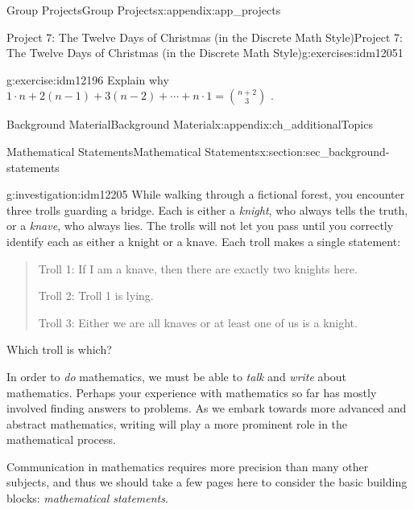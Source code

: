 \documentclass[oneside,10pt,]{book}
\numberwithin{equation}{chapter}
\begin{document}
\begin{appendixptx}{Group Projects}{}{Group Projects}{}{}{x:appendix:app_projects}
\begin{exercises-section-numberless}{Project 7: The Twelve Days of Christmas (in the Discrete Math Style)}{}{Project 7: The Twelve Days of Christmas (in the Discrete Math Style)}{}{}{g:exercises:idm12051}
\begin{divisionexercise}{6}{}{}{g:exercise:idm12196}%
Explain why \(1 \cdot n + 2\left( n - 1 \right) + 3\left( n - 2 \right) + \cdots + n \cdot 1 =
\binom{n + 2}{3}\) .%
\end{divisionexercise}%
\end{exercises-section-numberless}
\end{appendixptx}
%
%
\typeout{************************************************}
\typeout{************************************************}
%
\begin{appendixptx}{Background Material}{}{Background Material}{}{}{x:appendix:ch_additionalTopics}
%
%
\typeout{************************************************}
\typeout{************************************************}
%
\begin{sectionptx}{Mathematical Statements}{}{Mathematical Statements}{}{}{x:section:sec_background-statements}
\begin{introduction}{}%
\begin{investigation}{}{g:investigation:idm12205}%
While walking through a fictional forest, you encounter three trolls guarding a bridge. Each is either a \emph{knight}, who always tells the truth, or a \emph{knave}, who always lies. The trolls will not let you pass until you correctly identify each as either a knight or a knave. Each troll makes a single statement:%
\begin{quote}%
Troll 1: If I am a knave, then there are exactly two knights here.%
\par
Troll 2: Troll 1 is lying.%
\par
Troll 3: Either we are all knaves or at least one of us is a knight.%
\end{quote}
Which troll is which?  %
\end{investigation}
In order to \emph{do} mathematics, we must be able to \emph{talk} and \emph{write} about mathematics. Perhaps your experience with mathematics so far has mostly involved finding answers to problems. As we embark towards more advanced and abstract mathematics, writing will play a more prominent role in the mathematical process.%
\par
Communication in mathematics requires more precision than many other subjects, and thus we should take a few pages here to consider the basic building blocks: \emph{mathematical statements}.%

\end{introduction}
\end{sectionptx}
\end{appendixptx}
\end{document}
